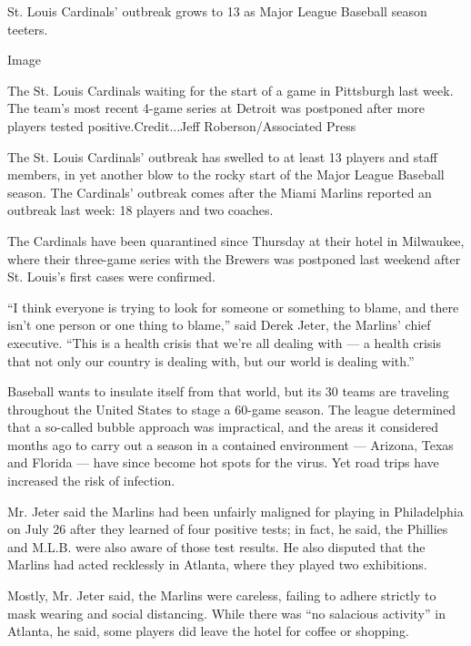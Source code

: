 St. Louis Cardinals' outbreak grows to 13 as Major League Baseball
season teeters.

Image

The St. Louis Cardinals waiting for the start of a game in Pittsburgh
last week. The team's most recent 4-game series at Detroit was postponed
after more players tested positive.Credit...Jeff Roberson/Associated
Press

The St. Louis Cardinals' outbreak has swelled to at least 13 players and
staff members, in yet another blow to the rocky start of the Major
League Baseball season. The Cardinals' outbreak comes after the Miami
Marlins reported an outbreak last week: 18 players and two coaches.

The Cardinals have been quarantined since Thursday at their hotel in
Milwaukee, where their three-game series with the Brewers was postponed
last weekend after St. Louis's first cases were confirmed.

``I think everyone is trying to look for someone or something to blame,
and there isn't one person or one thing to blame,'' said Derek Jeter,
the Marlins' chief executive. ``This is a health crisis that we're all
dealing with --- a health crisis that not only our country is dealing
with, but our world is dealing with.''

Baseball wants to insulate itself from that world, but its 30 teams are
traveling throughout the United States to stage a 60-game season. The
league determined that a so-called bubble approach was impractical, and
the areas it considered months ago to carry out a season in a contained
environment --- Arizona, Texas and Florida --- have since become hot
spots for the virus. Yet road trips have increased the risk of
infection.

Mr. Jeter said the Marlins had been unfairly maligned for playing in
Philadelphia on July 26 after they learned of four positive tests; in
fact, he said, the Phillies and M.L.B. were also aware of those test
results. He also disputed that the Marlins had acted recklessly in
Atlanta, where they played two exhibitions.

Mostly, Mr. Jeter said, the Marlins were careless, failing to adhere
strictly to mask wearing and social distancing. While there was ``no
salacious activity'' in Atlanta, he said, some players did leave the
hotel for coffee or shopping.

\hypertarget{-7}{%
\subsection{}\label{-7}}


